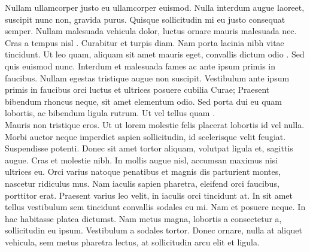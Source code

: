 \documentclass[a4paper,12pt]{article}
\begin{document}
Nullam ullamcorper justo eu ullamcorper euismod. Nulla interdum augue laoreet, suscipit nunc non, gravida purus. Quisque sollicitudin mi eu justo consequat semper. Nullam malesuada vehicula dolor, luctus ornare mauris malesuada nec. Cras a tempus nisl \cite{RN398}. Curabitur et turpis diam. Nam porta lacinia nibh vitae tincidunt. Ut leo quam, aliquam sit amet mauris eget, convallis dictum odio \cite{RN1022}. Sed quis euismod nunc. Interdum et malesuada fames ac ante ipsum primis in faucibus. Nullam egestas tristique augue non suscipit. Vestibulum ante ipsum primis in faucibus orci luctus et ultrices posuere cubilia Curae; Praesent bibendum rhoncus neque, sit amet elementum odio. Sed porta dui eu quam lobortis, ac bibendum ligula rutrum. Ut vel tellus quam \cite{RN635,RN1142}.\\
Mauris non tristique eros. Ut ut lorem molestie felis placerat lobortis id vel nulla. Morbi auctor neque imperdiet sapien sollicitudin, id scelerisque velit feugiat. Suspendisse potenti. Donec sit amet tortor aliquam, volutpat ligula et, sagittis augue. Cras et molestie nibh. In mollis augue nisl, accumsan maximus nisi ultrices eu. Orci varius natoque penatibus et magnis dis parturient montes, nascetur ridiculus mus. Nam iaculis sapien pharetra, eleifend orci faucibus, porttitor erat. Praesent varius leo velit, in iaculis orci tincidunt at. In sit amet tellus vestibulum sem tincidunt convallis sodales eu mi. Nam et posuere neque. In hac habitasse platea dictumst. Nam metus magna, lobortis a consectetur a, sollicitudin eu ipsum. Vestibulum a sodales tortor. Donec ornare, nulla at aliquet vehicula, sem metus pharetra lectus, at sollicitudin arcu elit et ligula.\\



\end{document}
